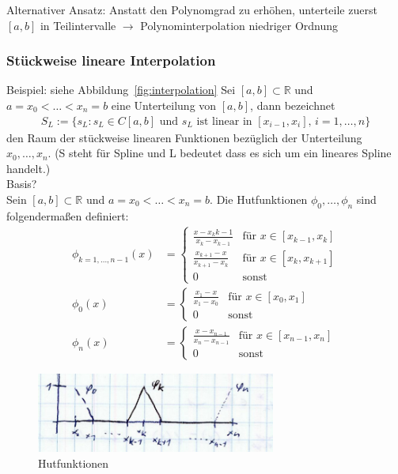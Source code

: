 Alternativer Ansatz: Anstatt den Polynomgrad zu erhöhen, unterteile zuerst $[a,b]$ in Teilintervalle
$\rightarrow$ Polynominterpolation niedriger Ordnung

\subsubsection{Stückweise lineare Interpolation}
Beispiel: siehe Abbildung~\ref{fig:interpolation}
Sei $[a,b] \subset \mathbb{R}$ und $a=x_0<\ldots<x_n=b$ eine Unterteilung von $[a,b]$, dann bezeichnet
\begin{align*}
  S_L:=\{s_L:s_L\in C[a,b] \text{ und } s_L \text{ ist linear in } [x_{i-1},x_i],\,i=1,\ldots,n\}
\end{align*}
den Raum der stückweise linearen Funktionen bezüglich der Unterteilung $x_0,\ldots,x_n$.
(S steht für Spline und L bedeutet dass es sich um ein lineares Spline handelt.)\\
Basis?\\
Sein $[a,b] \subset \mathbb{R}$ und $a=x_0<\ldots<x_n=b$. Die Hutfunktionen $\phi_0,\ldots,\phi_n$
sind folgendermaßen definiert:
\begin{align*}
  \phi_{k=1,\ldots,n-1}(x) &= \begin{cases}
    \frac{x-x_k{k-1}}{x_k-x_{k-1}} &\mbox{für } x\in[x_{k-1},x_k]\\
    \frac{x_{k+1}-x}{x_{k+1}-x_k} &\mbox{für } x\in[x_k,x_{k+1}]\\
    0 &\mbox{sonst}
  \end{cases}\\
  \phi_0(x) &= \begin{cases}
    \frac{x_1-x}{x_1-x_0} &\mbox{für } x\in[x_0,x_1]\\
    0 &\mbox{sonst}
  \end{cases}\\
  \phi_n(x) &= \begin{cases}
    \frac{x-x_{n-1}}{x_n-x_{n-1}} &\mbox{für } x\in[x_{n-1},x_n]\\
    0 &\mbox{sonst}
  \end{cases}
\end{align*}
\begin{figure}[htbp]
  \centering
  \includegraphics[width=0.7\textwidth]{figures/hutfunktionen.png}
  \caption{Hutfunktionen}
\end{figure}
